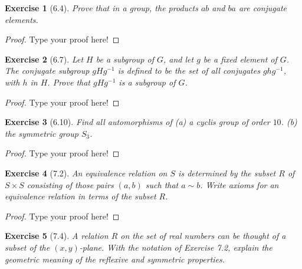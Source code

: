 \documentclass[12pt,leqno]{article}
\numberwithin{equation}{section}
\newtheorem*{exer}{Exercise}
\theoremstyle{definition}
\begin{document}
\begin{exer}[6.4]Prove that in a group, the products $ab$ and $ba$ are conjugate elements.
\end{exer}

\begin{proof}[Proof]
Type your proof here!
\end{proof}



\begin{exer}[6.7]
Let $H$ be a subgroup of $G$, and let $g$ be a fixed element of $G$. The \emph{conjugate subgroup} $gHg^{-1}$ is defined to be the set of all conjugates $ghg^{-1}$, with $h$ in $H$. Prove that $gHg^{-1}$ is a subgroup of $G$. 
\end{exer}

\begin{proof}[Proof]
Type your proof here!
\end{proof}

\begin{exer}[6.10]Find all automorphisms of (a) a cyclis group of order $10$. (b) the symmetric group $S_3$.

\end{exer}

\begin{proof}[Proof]
Type your proof here!
\end{proof}

\begin{exer}[7.2]An equivalence relation on $S$ is determined by the subset $R$ of $S \times S$ consisting of those pairs $(a,b)$ such that $a \sim b$. Write axioms for an equivalence relation in terms of the subset $R$.

\end{exer}

\begin{proof}[Proof]
Type your proof here!
\end{proof}

\begin{exer}[7.4] 
A relation $R$ on the set of real numbers can be thought of a subset of the $(x,y)$-plane. With the notation of Exercise 7.2, explain the geometric meaning of the reflexive and symmetric properties.

\end{exer}
\end{document}
